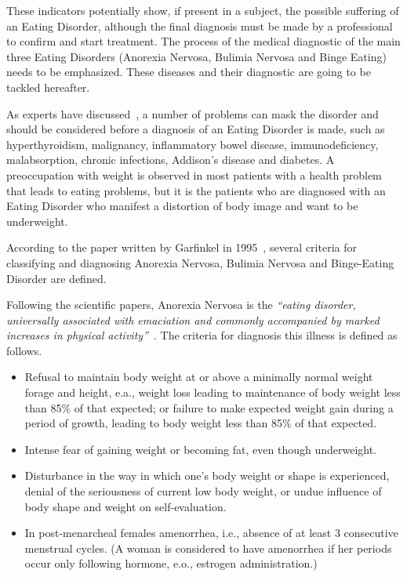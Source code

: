 These indicators potentially show, if present in a subject, the possible suffering of an Eating Disorder, although the final diagnosis must be made by a professional to confirm and start treatment. The process of the medical diagnostic of the main three Eating Disorders (Anorexia Nervosa, Bulimia Nervosa and Binge Eating) needs to be emphasized. These diseases and their diagnostic are going to be tackled hereafter.


As experts have discussed~\cite{pritts2003diagnosis}, a number of problems can mask the disorder and should be considered before a diagnosis of an Eating Disorder is made, such as hyperthyroidism, malignancy, inflammatory bowel disease, immunodeficiency, malabsorption, chronic infections, Addison's disease and diabetes. A preoccupation with weight is observed in most patients with a health problem that leads to eating problems, but it is the patients who are diagnosed with an Eating Disorder who manifest a distortion of body image and want to be underweight.

According to the paper written by Garfinkel in 1995~\cite{garfinkel1995views}, several criteria for classifying and diagnosing Anorexia Nervosa, Bulimia Nervosa and Binge-Eating Disorder are defined.


Following the scientific papers, Anorexia Nervosa is the \textit{``eating disorder, universally associated with emaciation and commonly accompanied by marked increases in physical activity''}~\cite{bulik2005anorexia}. The criteria for diagnosis this illness is defined as follows.
\begin{itemize}
    \item Refusal to maintain body weight at or above a minimally normal weight forage and height, e.a., weight loss leading to maintenance of body weight less than 85\% of that expected; or failure to make expected weight gain during a period of growth, leading to body weight less than 85\% of that expected.
    \item Intense fear of gaining weight or becoming fat, even though underweight.
    \item Disturbance in the way in which one's body weight or shape is experienced, denial of the seriousness of current low body weight, or undue influence of body shape and weight on self-evaluation.
    \item In post-menarcheal females amenorrhea, i.e., absence of at least 3 consecutive menstrual cycles. (A woman is considered to have amenorrhea if her periods occur only following hormone, e.o., estrogen administration.)
\end{itemize}

